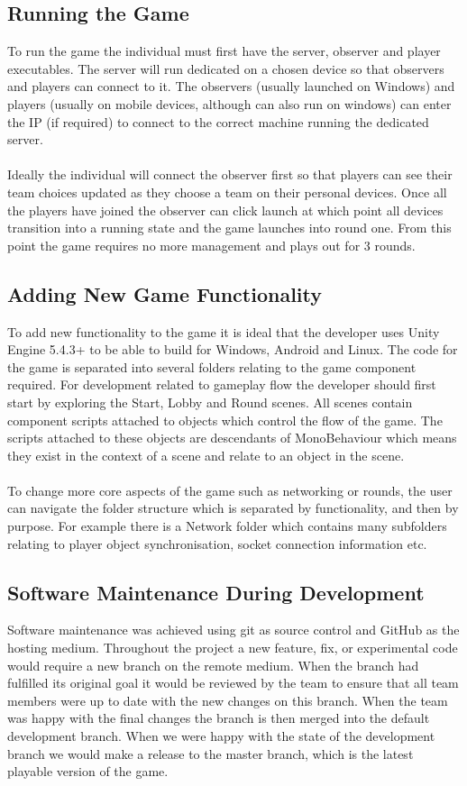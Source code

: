 \documentclass[11pt,a4paper]{article}
\begin{document}
 \subsection{Running the Game}
 To run the game the individual must first have the server, observer and player executables. The server will run dedicated on a chosen device so that observers and players can connect to it. The observers (usually launched on Windows)  and players (usually on mobile devices, although can also run on windows) can enter the IP (if required) to connect to the correct machine running the dedicated server. \\ \\
 Ideally the individual will connect the observer first so that players can see their team choices updated as they choose a team on their personal devices. Once all the players have joined the observer can click launch at which point all devices transition into a running state and the game launches into round one. From this point the game requires no more management and plays out for 3 rounds.

 \subsection{Adding New Game Functionality}
 To add new functionality to the game it is ideal that the developer uses Unity Engine 5.4.3+ to be able to build for Windows, Android and Linux. The code for the game is separated into several folders relating to the game component required. For development related to gameplay flow the developer should first start by exploring the Start, Lobby and Round scenes. All scenes contain component scripts attached to objects which control the flow of the game. The scripts attached to these objects are descendants of MonoBehaviour which means they exist in the context of a scene and relate to an object in the scene.  \\ \\
 To change more core aspects of the game such as networking or rounds, the user can navigate the folder structure which is separated by functionality, and then by purpose. For example there is a Network folder which contains many subfolders relating to player object synchronisation, socket connection information etc.

 \subsection{Software Maintenance During Development}
 Software maintenance was achieved using git as source control and GitHub as the hosting medium. Throughout the project a new feature, fix, or experimental code would require a new branch on the remote medium. When the branch had fulfilled its original goal it would be reviewed by the team to ensure that all team members were up to date with the new changes on this branch. When the team was happy with the final changes the branch is then merged into the default development branch. When we were happy with the state of the development branch we would make a release to the master branch, which is the latest playable version of the game.
\end{document}
